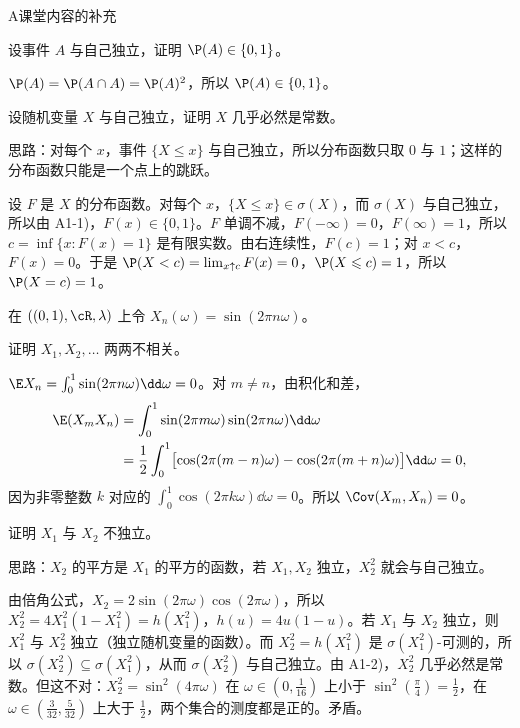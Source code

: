 \begin{exercises}{A}{课堂内容的补充}
\item\label{ex:independence:A1} 
\begin{questions}
\item 设事件 $A$ 与自己独立，证明 $\P(A)\in\{0,1\}$。
\begin{solution}
$\P(A)=\P(A\cap A)=\P(A)^2$，所以 $\P(A)\in\{0,1\}$。
\end{solution}
\item 设随机变量 $X$ 与自己独立，证明 $X$ 几乎必然是常数。
\begin{solution}
思路：对每个 $x$，事件 $\{X\leqslant x\}$ 与自己独立，所以分布函数只取 $0$ 与 $1$；这样的分布函数只能是一个点上的跳跃。

设 $F$ 是 $X$ 的分布函数。对每个 $x$，$\{X\leqslant x\}\in\sigma(X)$，而 $\sigma(X)$ 与自己独立，所以由 A1-1)，$F(x)\in\{0,1\}$。$F$ 单调不减，$F(-\infty)=0$，$F(\infty)=1$，所以 $c=\inf\{x:F(x)=1\}$ 是有限实数。由右连续性，$F(c)=1$；对 $x<c$，$F(x)=0$。于是 $\P(X<c)=\lim_{x\uparrow c}F(x)=0$，$\P(X\leqslant c)=1$，所以 $\P(X=c)=1$。
\end{solution}
\end{questions}

\item\label{ex:independence:A2} 在 $((0,1),\cR,\lambda)$ 上令 $X_n(\omega)=\sin(2\pi n\omega)$。
\begin{questions}
\item 证明 $X_1,X_2,\dots$ 两两不相关。
\begin{solution}
$\E X_n=\int_0^1\sin(2\pi n\omega)\dd\omega=0$。对 $m\neq n$，由积化和差，
\[
\begin{aligned}
\E(X_mX_n)&=\int_0^1\sin(2\pi m\omega)\sin(2\pi n\omega)\dd\omega\\
&=\frac12\int_0^1\bigl[\cos(2\pi(m-n)\omega)-\cos(2\pi(m+n)\omega)\bigr]\dd\omega=0,
\end{aligned}
\]
因为非零整数 $k$ 对应的 $\int_0^1\cos(2\pi k\omega)\dd\omega=0$。所以 $\Cov(X_m,X_n)=0$。
\end{solution}
\item 证明 $X_1$ 与 $X_2$ 不独立。
\begin{solution}
思路：$X_2$ 的平方是 $X_1$ 的平方的函数，若 $X_1,X_2$ 独立，$X_2^2$ 就会与自己独立。

由倍角公式，$X_2=2\sin(2\pi\omega)\cos(2\pi\omega)$，所以 $X_2^2=4X_1^2(1-X_1^2)=h(X_1^2)$，$h(u)=4u(1-u)$。若 $X_1$ 与 $X_2$ 独立，则 $X_1^2$ 与 $X_2^2$ 独立（独立随机变量的函数）。而 $X_2^2=h(X_1^2)$ 是 $\sigma(X_1^2)$-可测的，所以 $\sigma(X_2^2)\subseteq\sigma(X_1^2)$，从而 $\sigma(X_2^2)$ 与自己独立。由 A1-2)，$X_2^2$ 几乎必然是常数。但这不对：$X_2^2=\sin^2(4\pi\omega)$ 在 $\omega\in(0,\frac1{16})$ 上小于 $\sin^2(\frac\pi4)=\frac12$，在 $\omega\in(\frac3{32},\frac5{32})$ 上大于 $\frac12$，两个集合的测度都是正的。矛盾。
\end{solution}
\end{questions}


\end{exercises}
